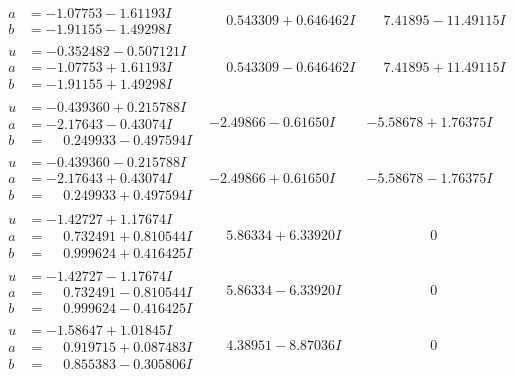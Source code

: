 \documentclass[1p]{elsarticle_modified}
\theoremstyle{definition}
\begin{document}
$$\begin{array}{c|c|c}
\begin{aligned}
a &= -1.07753 - 1.61193 I \\
b &= -1.91155 - 1.49298 I\end{aligned}
 & \phantom{-}0.543309 + 0.646462 I & \phantom{-}7.41895 - 11.49115 I \\ \hline\begin{aligned}
u &= -0.352482 - 0.507121 I \\
a &= -1.07753 + 1.61193 I \\
b &= -1.91155 + 1.49298 I\end{aligned}
 & \phantom{-}0.543309 - 0.646462 I & \phantom{-}7.41895 + 11.49115 I \\ \hline\begin{aligned}
u &= -0.439360 + 0.215788 I \\
a &= -2.17643 - 0.43074 I \\
b &= \phantom{-}0.249933 - 0.497594 I\end{aligned}
 & -2.49866 - 0.61650 I & -5.58678 + 1.76375 I \\ \hline\begin{aligned}
u &= -0.439360 - 0.215788 I \\
a &= -2.17643 + 0.43074 I \\
b &= \phantom{-}0.249933 + 0.497594 I\end{aligned}
 & -2.49866 + 0.61650 I & -5.58678 - 1.76375 I \\ \hline\begin{aligned}
u &= -1.42727 + 1.17674 I \\
a &= \phantom{-}0.732491 + 0.810544 I \\
b &= \phantom{-}0.999624 + 0.416425 I\end{aligned}
 & \phantom{-}5.86334 + 6.33920 I & \phantom{-0.000000 } 0 \\ \hline\begin{aligned}
u &= -1.42727 - 1.17674 I \\
a &= \phantom{-}0.732491 - 0.810544 I \\
b &= \phantom{-}0.999624 - 0.416425 I\end{aligned}
 & \phantom{-}5.86334 - 6.33920 I & \phantom{-0.000000 } 0 \\ \hline\begin{aligned}
u &= -1.58647 + 1.01845 I \\
a &= \phantom{-}0.919715 + 0.087483 I \\
b &= \phantom{-}0.855383 - 0.305806 I\end{aligned}
 & \phantom{-}4.38951 - 8.87036 I & \phantom{-0.000000 } 0 \\ \hline\begin{aligned}

\end{aligned}
\end{array}$$
\end{document}
